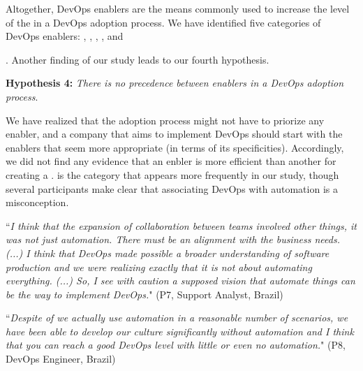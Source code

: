 Altogether, DevOps enablers are the means commonly used to increase the level of
the \cc in a DevOps adoption process.
We have identified five categories of DevOps enablers:
, , ,
, and {. Another finding of our
study leads to our fourth hypothesis.

\begin{mh}
\textbf{Hypothesis 4:} \textit{There is no precedence between enablers in a DevOps adoption process}.
\end{mh}

We have realized that the adoption process might not have
to priorize any enabler, and a company that aims to implement
DevOps should start with  the enablers that seem more appropriate (in terms
of its specificities). Accordingly, we did not find any evidence that an enbler
is more efficient than another for creating a \cc.  is the category
that appears more frequently in our study, though several participants make
clear that associating DevOps with automation is a misconception.

\begin{mq}
``\emph{I think that the expansion of collaboration between teams involved other
things, it was not just automation. There must be an alignment with the
business needs. (...) I think that DevOps made possible a broader understanding
of software production and we were realizing exactly that it is not about
automating everything. (...) So, I see with caution a supposed vision that automate things can
be the way to implement DevOps.}" (P7, Support Analyst, Brazil)
\end{mq}

\begin{mq}
``\emph{Despite of we actually use automation in a reasonable number of scenarios,
we have been able to develop our culture significantly without automation and I think that you can reach a
good DevOps level with little or even no automation.}" (P8, DevOps Engineer, Brazil)
\end{mq}


}
